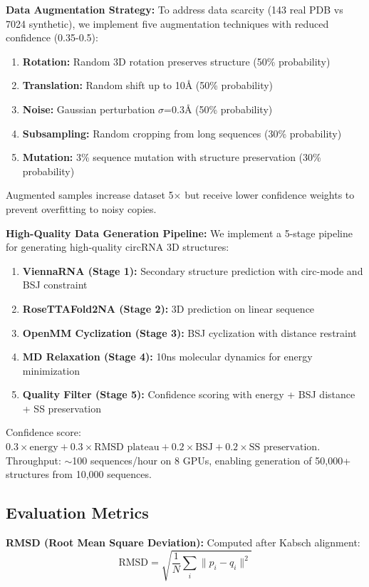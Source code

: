 \documentclass[12pt]{article}
\begin{document}
\textbf{Data Augmentation Strategy:} To address data scarcity (143 real PDB vs 7024 synthetic), we implement five augmentation techniques with reduced confidence (0.35-0.5):
\begin{enumerate}
\item \textbf{Rotation:} Random 3D rotation preserves structure (50\% probability)
\item \textbf{Translation:} Random shift up to 10Å (50\% probability)
\item \textbf{Noise:} Gaussian perturbation $\sigma$=0.3Å (50\% probability)
\item \textbf{Subsampling:} Random cropping from long sequences (30\% probability)
\item \textbf{Mutation:} 3\% sequence mutation with structure preservation (30\% probability)
\end{enumerate}
Augmented samples increase dataset 5$\times$ but receive lower confidence weights to prevent overfitting to noisy copies.

\textbf{High-Quality Data Generation Pipeline:} We implement a 5-stage pipeline for generating high-quality circRNA 3D structures:
\begin{enumerate}
\item \textbf{ViennaRNA (Stage 1):} Secondary structure prediction with circ-mode and BSJ constraint
\item \textbf{RoseTTAFold2NA (Stage 2):} 3D prediction on linear sequence
\item \textbf{OpenMM Cyclization (Stage 3):} BSJ cyclization with distance restraint
\item \textbf{MD Relaxation (Stage 4):} 10ns molecular dynamics for energy minimization
\item \textbf{Quality Filter (Stage 5):} Confidence scoring with energy + BSJ distance + SS preservation
\end{enumerate}
Confidence score: $0.3 \times \text{energy} + 0.3 \times \text{RMSD plateau} + 0.2 \times \text{BSJ} + 0.2 \times \text{SS preservation}$. Throughput: $\sim$100 sequences/hour on 8 GPUs, enabling generation of 50,000+ structures from 10,000 sequences.

\subsection{Evaluation Metrics}

\textbf{RMSD (Root Mean Square Deviation):} Computed after Kabsch alignment:
\begin{equation}
\text{RMSD} = \sqrt{\frac{1}{N} \sum_{i} \|p_i - q_i\|^2}
\end{equation}
\end{document}
